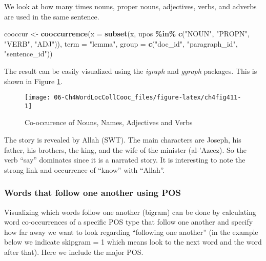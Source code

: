 \documentclass[
]{article}
\newenvironment{Shaded}{\begin{snugshade}}{\end{snugshade}}
\newcommand{\AttributeTok}[1]{\textcolor[rgb]{0.13,0.29,0.53}{#1}}
\newcommand{\FunctionTok}[1]{\textcolor[rgb]{0.13,0.29,0.53}{\textbf{#1}}}
\newcommand{\NormalTok}[1]{#1}
\newcommand{\OtherTok}[1]{\textcolor[rgb]{0.56,0.35,0.01}{#1}}
\newcommand{\SpecialCharTok}[1]{\textcolor[rgb]{0.81,0.36,0.00}{\textbf{#1}}}
\newcommand{\StringTok}[1]{\textcolor[rgb]{0.31,0.60,0.02}{#1}}
\begin{document}
We look at how many times nouns, proper nouns, adjectives, verbs, and adverbs are used in the same sentence.

\footnotesize

\begin{Shaded}
\begin{Highlighting}[]
\NormalTok{cooccur }\OtherTok{\textless{}{-}} \FunctionTok{cooccurrence}\NormalTok{(}\AttributeTok{x =} \FunctionTok{subset}\NormalTok{(x, upos }\SpecialCharTok{\%in\%} \FunctionTok{c}\NormalTok{(}\StringTok{"NOUN"}\NormalTok{, }\StringTok{"PROPN"}\NormalTok{, }\StringTok{"VERB"}\NormalTok{, }\StringTok{"ADJ"}\NormalTok{)), }
                     \AttributeTok{term =} \StringTok{"lemma"}\NormalTok{, }
                     \AttributeTok{group =} \FunctionTok{c}\NormalTok{(}\StringTok{"doc\_id"}\NormalTok{, }\StringTok{"paragraph\_id"}\NormalTok{, }\StringTok{"sentence\_id"}\NormalTok{))}
\end{Highlighting}
\end{Shaded}

\normalsize

The result can be easily visualized using the \emph{igraph} and \emph{ggraph} packages. This is shown in Figure \ref{fig:ch4fig411}.

\begin{figure}

{\centering \texttt{[image: 06-Ch4WordLocCollCooc\_files/figure-latex/ch4fig411-1]} 

}

\caption{Co-occurence of Nouns, Names, Adjectives and Verbs}\label{fig:ch4fig411}
\end{figure}

The story is revealed by Allah (SWT). The main characters are Joseph, his father, his brothers, the king, and the wife of the minister (al-'Azeez). So the verb ``say'' dominates since it is a narrated story. It is interesting to note the strong link and occurrence of ``know'' with ``Allah''.

\hypertarget{words-that-follow-one-another-using-pos}{%
\subsubsection{Words that follow one another using POS}\label{words-that-follow-one-another-using-pos}}

Visualizing which words follow one another (bigram) can be done by calculating word co-occurrences of a specific POS type that follow one another and specify how far away we want to look regarding ``following one another'' (in the example below we indicate skipgram = 1 which means look to the next word and the word after that). Here we include the major POS.
\end{document}
